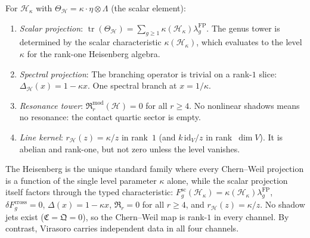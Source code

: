\begin{example}
\label{ex:chern-weil-heisenberg}
For $\mathcal{H}_\kappa$ with $\Theta_{\mathcal{H}} = \kappa
\cdot \eta \otimes \Lambda$ (the scalar element):
\begin{enumerate}[label=\textup{(\roman*)}]
\item \emph{Scalar projection}:
$\operatorname{tr}(\Theta_{\mathcal{H}})
= \sum_{g \geq 1}
\kappa(\mathcal{H}_\kappa)\lambda_g^{\mathrm{FP}}$.
The genus tower is determined by the scalar characteristic
\(\kappa(\mathcal{H}_\kappa)\), which evaluates to the level
\(\kappa\) for the rank-one Heisenberg algebra.
\item \emph{Spectral projection}: The branching operator is trivial
on a rank-$1$ slice: $\Delta_{\mathcal{H}}(x) = 1 - \kappa x$.
One spectral branch at $x = 1/\kappa$.
\item \emph{Resonance tower}: $\mathfrak{R}^{\mathrm{mod}}_r
(\mathcal{H}) = 0$ for all $r \geq 4$. No nonlinear shadows
means no resonance: the contact quartic sector is empty.
\item \emph{Line kernel}: $r_{\mathcal{H}}(z)=\kappa/z$ in rank~$1$
(and $k\,\mathrm{id}_V/z$ in rank~$\dim V$). It is abelian and
rank-one, but not zero unless the level vanishes.
\end{enumerate}
The Heisenberg is the unique standard family where every
Chern--Weil projection is a function of the single level parameter
\(\kappa\) alone, while the scalar projection itself factors through
the typed characteristic:
$F_g^{\mathrm{sc}}(\mathcal H_\kappa)
= \kappa(\mathcal H_\kappa)\lambda_g^{\mathrm{FP}}$,
$\delta F_g^{\mathrm{cross}}=0$,
$\Delta(x) = 1 - \kappa x$,
$\mathfrak{R}_r = 0$ for all $r \geq 4$, and
$r_{\mathcal{H}}(z)=\kappa/z$. No shadow jets exist
($\mathfrak{C} = \mathfrak{Q} = 0$), so the Chern--Weil
map is rank-$1$ in every channel. By contrast, Virasoro
carries independent data in all four channels.
\end{example}

